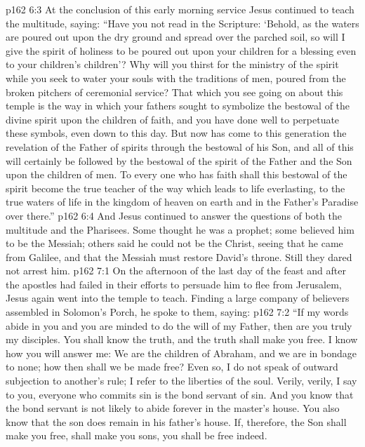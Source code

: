 \vs p162 6:3 At the conclusion of this early morning service Jesus continued to teach the multitude, saying: \textcolor{ubdarkred}{“Have you not read in the Scripture: ‘Behold, as the waters are poured out upon the dry ground and spread over the parched soil, so will I give the spirit of holiness to be poured out upon your children for a blessing even to your children’s children’? Why will you thirst for the ministry of the spirit while you seek to water your souls with the traditions of men, poured from the broken pitchers of ceremonial service? That which you see going on about this temple is the way in which your fathers sought to symbolize the bestowal of the divine spirit upon the children of faith, and you have done well to perpetuate these symbols, even down to this day. But now has come to this generation the revelation of the Father of spirits through the bestowal of his Son, and all of this will certainly be followed by the bestowal of the spirit of the Father and the Son upon the children of men. To every one who has faith shall this bestowal of the spirit become the true teacher of the way which leads to life everlasting, to the true waters of life in the kingdom of heaven on earth and in the Father’s Paradise over there.”}
\vs p162 6:4 And Jesus continued to answer the questions of both the multitude and the Pharisees. Some thought he was a prophet; some believed him to be the Messiah; others said he could not be the Christ, seeing that he came from Galilee, and that the Messiah must restore David’s throne. Still they dared not arrest him.
\vs p162 7:1 On the afternoon of the last day of the feast and after the apostles had failed in their efforts to persuade him to flee from Jerusalem, Jesus again went into the temple to teach. Finding a large company of believers assembled in Solomon’s Porch, he spoke to them, saying:
\vs p162 7:2 \pc “If my words abide in you and you are minded to do the will of my Father, then are you truly my disciples. You shall know the truth, and the truth shall make you free. I know how you will answer me: We are the children of Abraham, and we are in bondage to none; how then shall we be made free? Even so, I do not speak of outward subjection to another’s rule; I refer to the liberties of the soul. Verily, verily, I say to you, everyone who commits sin is the bond servant of sin. And you know that the bond servant is not likely to abide forever in the master’s house. You also know that the son does remain in his father’s house. If, therefore, the Son shall make you free, shall make you sons, you shall be free indeed.
